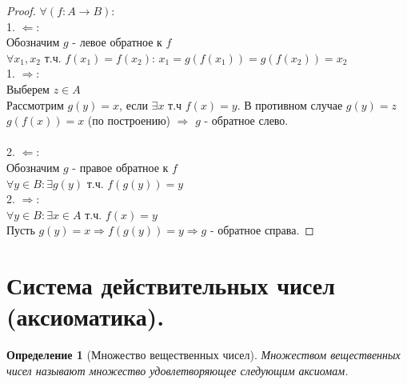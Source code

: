 \documentclass[11pt,a4paper,titlepage]{article}
\newtheorem*{definition}{Определение}
\renewcommand{\implies}{\Rightarrow}
\newcommand{\bimplies}{\Leftarrow}
\begin{document}
    \begin{proof}
        $\forall (f: A \to B)$:\\
        1.  $\bimplies$:\\
        Обозначим $g$ - левое обратное к $f$ \\
        $\forall x_1, x_2$ т.ч. $f(x_1) = f(x_2)$: $x_1 = g(f(x_1)) = g(f(x_2)) = x_2$ \\
        1.  $\implies$:\\
        Выберем $z \in  A$ \\
        Рассмотрим $g(y) = x$, если $\exists x$ т.ч $f(x)=y$. В противном случае $g(y) = z$ \\
        $g(f(x)) = x$ (по построению) $\implies$ $g$ - обратное слево.\\
        \\
        2.  $\bimplies$: \\
        Обозначим $g$ - правое обратное к $f$ \\
        $\forall y \in B: \exists g(y)$ т.ч. $f(g(y)) = y$\\
        2.  $\implies$: \\
        $\forall y \in B: \exists x \in A$ т.ч. $f(x) = y$ \\
        Пусть $g(y) = x \implies f(g(y)) = y \implies g$ - обратное справа.


    \end{proof}


    \section{Система действительных чисел (аксиоматика).}

    \begin{definition}[Множество вещественных чисел]
        Множеством вещественных чисел называют множество удовлетворяющее следующим аксиомам.
    \end{definition}
\end{document}
